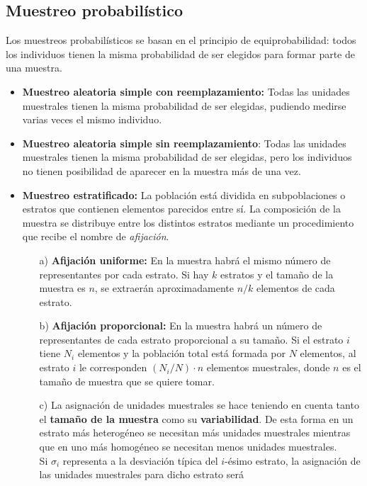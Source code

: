 \subsection{Muestreo probabilístico}
Los muestreos probabilísticos se basan en el principio de equiprobabilidad: todos los individuos tienen la misma probabilidad de ser elegidos para formar parte de una muestra.
\begin{itemize}
    \item \textbf{Muestreo aleatoria simple con reemplazamiento:} Todas las unidades muestrales tienen la misma probabilidad de ser elegidas, pudiendo medirse varias veces el mismo individuo.
    \item \textbf{Muestreo aleatoria simple sin reemplazamiento}: Todas las unidades muestrales tienen la misma probabilidad de ser elegidas, pero los individuos no tienen posibilidad de aparecer en la muestra más de una vez.
    \item \textbf{Muestreo estratificado:} La población está dividida en subpoblaciones o estratos que contienen elementos parecidos entre sí. La composición de la muestra se distribuye entre los distintos estratos mediante un procedimiento que recibe el nombre de \textit{afijación}.
    \begin{enumerate}
        \item[a)] \textbf{Afijación uniforme:} En la muestra habrá el mismo número de representantes por cada estrato. Si hay $k$ estratos y el tamaño de la muestra es $n$, se extraerán aproximadamente $n/k$ elementos de cada estrato.
        \item[b)] \textbf{Afijación proporcional:} En la muestra habrá un número de representantes de cada estrato proporcional a su tamaño. Si el estrato $i$ tiene $N_i$ elementos y la población total está formada por $N$ elementos, al estrato $i$ le corresponden $(N_i/N) \cdot n$ elementos muestrales, donde $n$ es el tamaño de muestra que se quiere tomar.
        \item[c)] La asignación de unidades muestrales se hace teniendo en cuenta tanto el \textbf{tamaño de la muestra} como su \textbf{variabilidad}. De esta forma en un estrato más heterogéneo se necesitan más unidades muestrales mientras que en uno más homogéneo se necesitan menos unidades muestrales.
        \\
        \newline
        Si $\sigma_i$ representa a la desviación típica del $i$-ésimo estrato, la asignación de las unidades muestrales para dicho estrato será
        \begin{align*}

\end{align*}
\end{enumerate}
\end{itemize}
